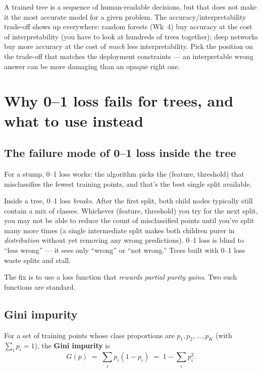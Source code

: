\documentclass[11pt, a4paper]{article}
\begin{document}
\begin{pitfallbox}
A trained tree is a sequence of human-readable decisions, but that does not make it the most accurate model for a given problem. The accuracy/interpretability trade-off shows up everywhere: random forests (Wk~4) buy accuracy at the cost of interpretability (you have to look at hundreds of trees together); deep networks buy more accuracy at the cost of \emph{much} less interpretability. Pick the position on the trade-off that matches the deployment constraints — an interpretable wrong answer can be more damaging than an opaque right one.
\end{pitfallbox}

\section{Why 0--1 loss fails for trees, and what to use instead}

\subsection{The failure mode of 0--1 loss inside the tree}

For a stump, 0--1 loss works: the algorithm picks the (feature, threshold) that misclassifies the fewest training points, and that's the best single split available.

Inside a tree, 0--1 loss \emph{breaks}. After the first split, both child nodes typically still contain a mix of classes. Whichever (feature, threshold) you try for the next split, you may not be able to reduce the count of misclassified points until you've split many more times (a single intermediate split makes both children purer in \emph{distribution} without yet removing any wrong predictions). 0--1 loss is blind to ``less wrong'' — it sees only ``wrong'' or ``not wrong.'' Trees built with 0--1 loss waste splits and stall.

The fix is to use a loss function that \emph{rewards partial purity gains}. Two such functions are standard.

\subsection{Gini impurity}

\begin{defbox}
For a set of training points whose class proportions are $p_1, p_2, \ldots, p_K$ (with $\sum_i p_i = 1$), the \textbf{Gini impurity} is
\[
G(p) \;=\; \sum_i p_i(1 - p_i) \;=\; 1 - \sum_i p_i^2.
\]
\end{defbox}
\end{document}
